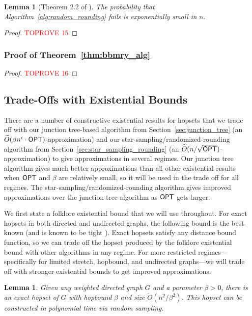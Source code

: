 \documentclass{article}
\newtheorem{lemma}[theorem]{Lemma}
\theoremstyle{definition}
\theoremstyle{remark}
\def\be    {\beta}
\def\opt {{\sf OPT}}
\begin{document}
\begin{lemma}[Theorem 2.2 of \cite{BBMRY11}] \label{lem:thin_fail}
    The probability that Algorithm~\ref{alg:random_rounding} fails is exponentially small in $n$.
\end{lemma}
\iflong
\begin{proof}\textcolor{red}{TOPROVE 15}\end{proof}
\else
\fi


\subsubsection{Proof of Theorem~\ref{thm:bbmry_alg}}
\begin{proof}\textcolor{red}{TOPROVE 16}\end{proof}





 
\subsection{Trade-Offs with Existential Bounds}\label{sec:existential}

There are a number of constructive existential results for hopsets that we trade off with our junction tree-based algorithm from Section~\ref{sec:junction_tree} (an $\widetilde{O}(\be n^\epsilon \cdot {\opt})$-approximation) and our star-sampling/randomized-rounding algorithm from Section~\ref{sec:star_sampling_rounding} (an $\widetilde{O}(n / \sqrt{\opt})$-approximation) to give approximations in several regimes. 
Our junction tree algorithm gives much better approximations than all other existential results when $\opt$ and $\beta$ are relatively small, so it will be used in the trade off for all regimes. The star-sampling/randomized-rounding algorithm gives improved approximations over the junction tree algorithm as ${\opt}$ gets larger. 

\iflong  
We first state a folklore existential bound that we will use throughout. For exact hopsets in both directed and undirected graphs, the following bound is the best-known (and is known to be tight \cite{BH23folklore}). Exact hopsets satisfy any distance bound function, so we can trade off the hopset produced by the folklore existential bound with other algorithms in any regime. For more restricted regimes---specifically for limited stretch, hopbound, and undirected graphs---we will trade off with stronger existential bounds to get improved approximations.

\begin{lemma}
    Given any weighted directed graph $G$ and a parameter $\beta >0$, there is an exact hopset of $G$ with hopbound $\beta$ and size $\widetilde{O}(n^2/\beta^2)$. This hopset can be constructed in polynomial time via random sampling.
\end{lemma}
\end{document}
